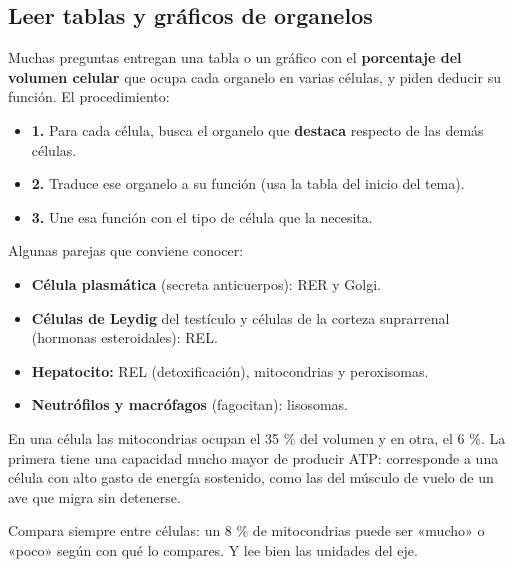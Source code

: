 \subsection{Leer tablas y gráficos de organelos}
Muchas preguntas entregan una tabla o un gráfico con el \textbf{porcentaje del volumen celular} que ocupa cada organelo en varias células, y piden deducir su función. El procedimiento:

 
\begin{itemize}
  \item \textbf{1.} Para cada célula, busca el organelo que \textbf{destaca} respecto de las demás células.
  \item \textbf{2.} Traduce ese organelo a su función (usa la tabla del inicio del tema).
  \item \textbf{3.} Une esa función con el tipo de célula que la necesita.
\end{itemize}
 

Algunas parejas que conviene conocer:

 
\begin{itemize}
  \item \textbf{Célula plasmática} (secreta anticuerpos): RER y Golgi.
  \item \textbf{Células de Leydig} del testículo y células de la corteza suprarrenal (hormonas esteroidales): REL.
  \item \textbf{Hepatocito:} REL (detoxificación), mitocondrias y peroxisomas.
  \item \textbf{Neutrófilos y macrófagos} (fagocitan): lisosomas.
\end{itemize}
  
\begin{ejemplo} En una célula las mitocondrias ocupan el 35 \% del volumen y en otra, el 6 \%. La primera tiene una capacidad mucho mayor de producir ATP: corresponde a una célula con alto gasto de energía sostenido, como las del músculo de vuelo de un ave que migra sin detenerse.\end{ejemplo}
 
\begin{clave}[{Recuerda}] Compara siempre entre células: un 8 \% de mitocondrias puede ser «mucho» o «poco» según con qué lo compares. Y lee bien las unidades del eje.\end{clave}
